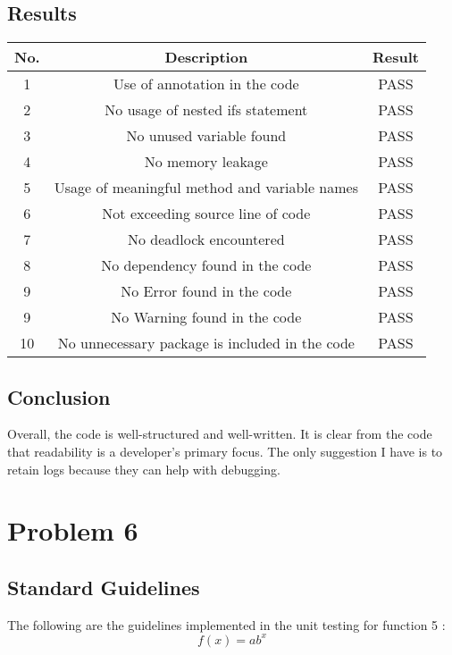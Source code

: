 \documentclass[a4paper,12pt]{article}
\begin{document}
    \subsection{Results}
    \begin{center}
    \begin{tabular}{||c c c||} 
     \hline
     No. & Description & Result \\ 
     \hline\hline
     1 & Use of annotation in the code  & PASS \\ 
     \hline
     2 & No usage of nested ifs statement & PASS \\
     \hline
     3 & No unused variable found & PASS \\
     \hline
     4 & No memory leakage & PASS \\
     \hline
     
     \hline
     5 & Usage of meaningful method and variable names & PASS \\
     \hline
     
     \hline
     6 & Not exceeding source line of  code & PASS \\
     \hline
     7 & No deadlock encountered & PASS \\
     \hline
     8 & No dependency found in the code & PASS \\
     \hline
     9 & No Error found in the code & PASS \\
     \hline
     9 & No Warning found in the code & PASS \\
     \hline
     10 & No unnecessary package is included in the code  & PASS \\
     \hline
    \end{tabular}
    \end{center}
    
    \subsection{Conclusion}
    Overall, the code is well-structured and well-written. It is clear from the code that readability is a developer's primary focus. The only suggestion I have is to retain logs because they can help with debugging.
    
\section{Problem 6}
    \subsection{Standard Guidelines}
    The following are the guidelines implemented in the unit testing for function 5 :
    \begin{equation} \label{Power_func}
	f(x) = ab^x
    \end{equation}
\end{document}
